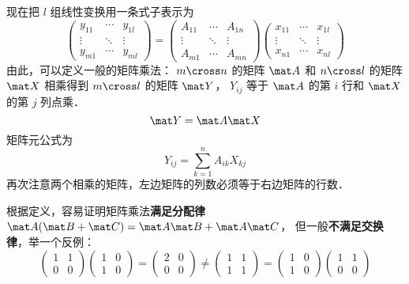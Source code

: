 现在把 $l$ 组线性变换用一条式子表示为
\begin{equation}
\begin{pmatrix}
y_{11} & \cdots & y_{1l} \\
 \vdots & \ddots & \vdots \\
y_{m1} & \cdots & y_{ml}
\end{pmatrix}
=
\begin{pmatrix}
A_{11} & \cdots & A_{1n} \\
 \vdots & \ddots & \vdots \\
A_{m1} & \cdots & A_{mn}
\end{pmatrix}
\begin{pmatrix}
x_{11} & \cdots & x_{1l} \\
 \vdots & \ddots & \vdots \\
x_{n1} & \cdots & x_{nl}
\end{pmatrix}
\end{equation}
由此，可以定义一般的矩阵乘法： $m \cross n$ 的矩阵 $\mat A$ 和 $n \cross l$ 的矩阵 $\mat X$ 相乘得到 $m \cross l$ 的矩阵 $\mat Y$，  $Y_{ij}$ 等于 $\mat A$ 的第 $i$ 行和 $\mat X$ 的第 $j$ 列点乘．
\begin{equation}
\mat Y=\mat A\mat X
\end{equation}
矩阵元公式为
\begin{equation}
Y_{ij} = \sum_{k = 1}^n A_{ik}X_{kj}
\end{equation}
再次注意两个相乘的矩阵，左边矩阵的列数必须等于右边矩阵的行数．

根据定义，容易证明矩阵乘法\textbf{满足分配律} $\mat A(\mat B+\mat C) = \mat A\mat B+\mat A\mat C$， 但一般\textbf{不满足交换律}，举一个反例：
\begin{equation}
\begin{pmatrix} 1 & 1\\ 0 & 0 \end{pmatrix}
\begin{pmatrix} 1 & 0\\ 1 & 0 \end{pmatrix} =
\begin{pmatrix} 2 & 0\\ 0 & 0 \end{pmatrix} \ne
\begin{pmatrix} 1 & 1\\ 1 & 1 \end{pmatrix} =
\begin{pmatrix} 1 & 0\\ 1 & 0 \end{pmatrix}
\begin{pmatrix} 1 & 1\\ 0 & 0 \end{pmatrix}
\end{equation}

